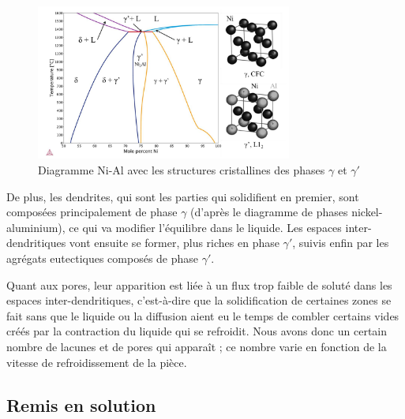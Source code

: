 
\begin{figure}[htbp]
    \centering
    \includegraphics[width=0.75\textwidth]{images/diagramme_phase.png}
    \caption{Diagramme Ni-Al avec les structures cristallines des phases $\gamma$ et $\gamma'$}
    \label{<label>}
\end{figure}


De plus, les dendrites, qui sont les parties qui solidifient en premier, sont composées 
principalement de phase $\gamma$ (d'après le diagramme de phases nickel-aluminium), 
ce qui va modifier l'équilibre dans le liquide.
Les espaces inter-dendritiques vont ensuite se former,  plus riches en phase $\gamma'$, 
suivis enfin par les agrégats eutectiques composés de phase $\gamma'$.

Quant aux pores, leur apparition est liée à un flux trop faible de soluté 
dans les espaces inter-dendritiques, c'est-à-dire que la solidification de 
certaines zones se fait sans que le liquide ou la diffusion aient eu le 
temps de combler certains vides créés par la contraction du liquide qui
se refroidit. Nous avons donc un certain nombre de lacunes et de pores qui
apparaît ; ce nombre varie en fonction de la vitesse de refroidissement 
de la pièce.


\subsection*{Remis en solution}

